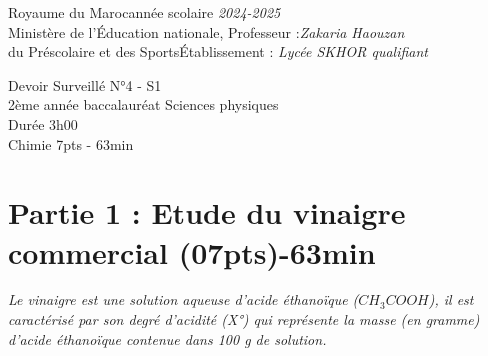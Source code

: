 \documentclass[12pt]{article}
\newcommand\headerMe[2]{\noindent{}#1\hfill#2}
\begin{document}
\headerMe{Royaume du Maroc}{année scolaire \emph{2024-2025}}\\
\headerMe{Ministère de l'Éducation nationale, }{  Professeur :\emph{Zakaria Haouzan}}\\
\headerMe{du Préscolaire et des Sports}{Établissement : \emph{Lycée SKHOR qualifiant}}\\
\vspace{-1cm}
\begin{center}
Devoir Surveillé  N°4 - S1 \\
    2ème année baccalauréat Sciences physiques\\
Durée 3h00
\\
    \vspace{-.2cm}
\hrulefill
\Large{Chimie 7pts - 63min}
\hrulefill\\

\end{center}

 \section*{Partie 1 : Etude du vinaigre commercial \dotfill(07pts)-63min }



 \emph{Le vinaigre est une solution aqueuse d’acide éthanoïque ($CH_3COOH$), il est
caractérisé par son degré d’acidité (X°) qui représente la masse (en gramme)
d’acide éthanoïque contenue dans 100 g de solution.}
\end{document}
